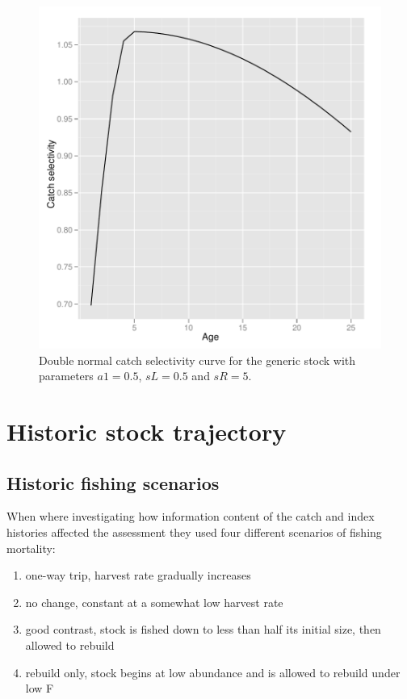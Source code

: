 \documentclass[a4paper]{article}
\begin{document}
\begin{figure}
\centering
\includegraphics{script-genericSelectivityPlot}
\caption{Double normal catch selectivity curve for the generic stock with parameters $a1=0.5$, $sL=0.5$ and $sR=5$.}
\label{fig:generic_selectivity}
\end{figure}



\section{Historic stock trajectory}

\subsection{Historic fishing scenarios}

When \cite{Magnusson:2007} where investigating how information content
of the catch and index histories affected the assessment they used four different
scenarios of fishing mortality:

\begin{enumerate}
\item one-way trip, harvest rate gradually increases
\item no change, constant at a somewhat low harvest rate
\item good contrast, stock is fished down to less than half its initial size, then allowed to rebuild
\item rebuild only, stock begins at low abundance and is allowed to rebuild under low F
\end{enumerate}
\end{document}
